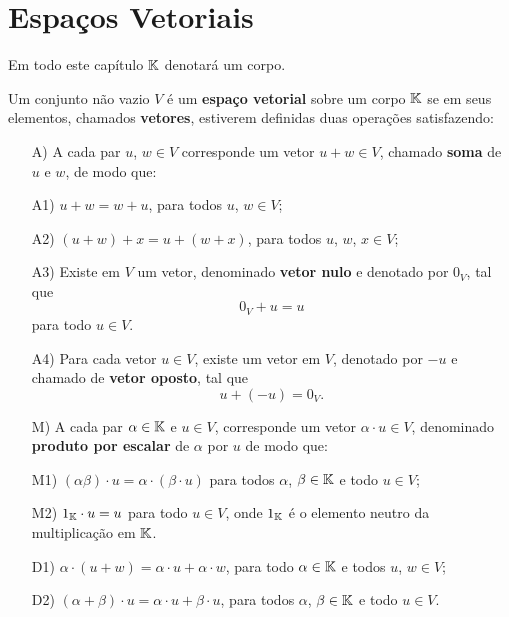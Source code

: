 
\chapter{Espaços Vetoriais}

Em todo este capítulo $\mathbb{K}$ denotará um corpo.

\begin{definicao}
  Um conjunto não vazio $V$ é um \textbf{espaço vetorial} sobre um corpo $\mathbb{K}$ se em seus elementos,
  chamados \textbf{vetores}, estiverem definidas duas operações satisfazendo:
  \begin{itemize}
    \item[A)] A cada par $u$, $w \in V$ corresponde um vetor $u + w \in V$, chamado \textbf{soma} de $u$ e $w$, de modo que:
    \item[A1)] $u + w = w + u$, para todos $u$, $w \in V$;
    \item[A2)] $(u + w) + x = u + (w + x)$, para todos $u$, $w$, $x \in V$;
    \item[A3)] Existe em $V$ um vetor, denominado \textbf{vetor nulo} e denotado por $0_V$, tal que
      \[
        0_V + u = u
      \]
      para todo $u \in V$.
    \item[A4)] Para cada vetor $u \in V$, existe um vetor em $V$, denotado por $-u$ e chamado de \textbf{vetor oposto}, tal que
      \[
        u + (-u) = 0_V.
      \]
    \item[M)] A cada par $\alpha \in \mathbb{K}$ e $u \in V$, corresponde um vetor $\alpha \cdot u \in V$, denominado \textbf{produto por escalar} de $\alpha$ por $u$ de modo que:
    \item[M1)] $(\alpha\beta)\cdot u = \alpha\cdot(\beta\cdot u)$ para todos $\alpha$, $\beta \in \mathbb{K}$ e todo $u \in V$;
    \item[M2)] $1_{\mathbb{K}}\cdot u = u$ para todo $u \in V$, onde $1_{\mathbb{K}}$ é o elemento neutro da multiplicação em $\mathbb{K}$.
    \item[D1)] $\alpha\cdot(u + w) = \alpha\cdot u + \alpha\cdot w$, para todo $\alpha \in \mathbb{K}$ e todos $u$, $w \in V$;
    \item[D2)] $(\alpha + \beta)\cdot u = \alpha\cdot u + \beta\cdot u$, para todos $\alpha$, $\beta \in \mathbb{K}$ e todo $u \in V$.
  \end{itemize}
\end{definicao}

